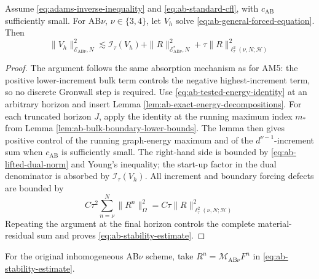 \documentclass[11pt]{article}
\begin{document}
\begin{thm}
\label{thm:adams-bashforth-stability}
Assume \eqref{eq:adams-inverse-inequality} and
\eqref{eq:ab-standard-cfl}, with \(c_{\mathrm{AB}}\) sufficiently small.
For AB\(\nu\), \(\nu\in\{3,4\}\), let \(V_h\) solve
\eqref{eq:ab-general-forced-equation}. Then
\begin{equation}
\|V_h\|_{\mathcal E_{\mathrm{AB}\nu},N}^2
\lesssim\mathcal I_{\tau}(V_h)
+\|R\|_{\mathcal E_{\mathrm{AB}\nu}^*,N}^2
+\tau\|R\|_{\ell_{\tau}^2(\nu,N;\mathcal H)}^2
\label{eq:ab-stability-estimate}
\end{equation}
\end{thm}
\begin{proof}
The argument follows the same absorption mechanism as for AM5: the positive
lower-increment bulk term controls the negative highest-increment term, so no
discrete Gronwall step is required.
Use \eqref{eq:ab-tested-energy-identity} at an arbitrary horizon and insert
Lemma \ref{lem:ab-exact-energy-decompositions}. For each truncated horizon
\(J\), apply the identity at the running maximum index \(m_*\) from Lemma
\ref{lem:ab-bulk-boundary-lower-bounds}. The lemma then gives positive control
of the running graph-energy maximum and of the \(d^{\nu-1}\)-increment sum when
\(c_{\mathrm{AB}}\) is sufficiently small. The right-hand side is bounded by
\eqref{eq:ab-lifted-dual-norm} and Young's inequality; the start-up factor in
the dual denominator is absorbed by \(\mathcal I_{\tau}(V_h)\). All increment
and boundary forcing defects are bounded by
\begin{equation}
C\tau^2\sum_{n=\nu}^N\|R^n\|_{\Omega}^2
=C\tau\|R\|_{\ell_{\tau}^2(\nu,N;\mathcal H)}^2
\label{eq:ab-forcing-defect-scaling}
\end{equation}
Repeating the argument at the final horizon controls the complete
material-residual sum and
proves \eqref{eq:ab-stability-estimate}.
\end{proof}

For the original inhomogeneous AB\(\nu\) scheme, take
\(R^n=\mathcal M_{\mathrm{AB}\nu}F^n\) in
\eqref{eq:ab-stability-estimate}.
\end{document}
